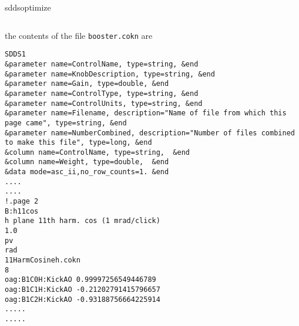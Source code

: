 \begin{sddsprog}{sddsoptimize}
\begin{verbatim}
\end{verbatim}
the contents of the file \verb+booster.cokn+ are
\begin{verbatim}
SDDS1
&parameter name=ControlName, type=string, &end
&parameter name=KnobDescription, type=string, &end
&parameter name=Gain, type=double, &end
&parameter name=ControlType, type=string, &end
&parameter name=ControlUnits, type=string, &end
&parameter name=Filename, description="Name of file from which this page came", type=string, &end
&parameter name=NumberCombined, description="Number of files combined to make this file", type=long, &end
&column name=ControlName, type=string,  &end
&column name=Weight, type=double,  &end
&data mode=asc_ii,no_row_counts=1. &end
....
....
!.page 2
B:h11cos
h plane 11th harm. cos (1 mrad/click)
1.0
pv
rad
11HarmCosineh.cokn
8
oag:B1C0H:KickAO 0.99997256549446789
oag:B1C1H:KickAO -0.21202791415796657
oag:B1C2H:KickAO -0.93188756664225914
.....
.....

\end{verbatim}


\end{sddsprog}
